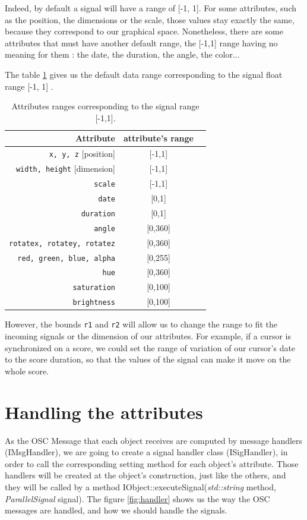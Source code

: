\documentclass[a4paper]{article}
\newcommand{\OSC}[1]		{\texttt{#1}}
\begin{document}
Indeed, by default a signal will have a range of [-1, 1]. For some attributes, such as the position, the dimensions or the scale, those values stay exactly the same, because they correspond to our graphical space. Nonetheless, there are some attributes that must have another default range, the [-1,1] range having no meaning for them : the date, the duration, the angle, the color...

The table \ref{ranges} gives us the default data range corresponding to the signal float range [-1, 1] .

\begin{table}[htdp]
\begin{center}
\begin{tabular}{|r|c|c|}
\hline
Attribute & attribute's range\\
\hline
\OSC{x, y, z} [position] 	& [-1,1]\\
\OSC{width, height} [dimension] 	& [-1,1] \\
\OSC{scale} 		& [-1,1] \\
\OSC{date} 		& [0,1]\\
\OSC{duration} 	& [0,1] \\
\OSC{angle}		& [0,360] \\
\OSC{rotatex, rotatey, rotatez} 		& [0,360] \\
\OSC{red, green, blue, alpha}			& [0,255] \\
\OSC{hue}  		& [0,360]\\
\OSC{saturation}  	& [0,100] \\
\OSC{brightness}  	& [0,100] \\
\hline
\end{tabular}
\end{center}
\caption{Attributes ranges corresponding to the signal range [-1,1].}
\label{ranges}
\end{table}%

However, the bounds \OSC{r1} and \OSC{r2} will allow us to change the range to fit the incoming signals or the dimension of our attributes. For example, if a cursor is synchronized on a score, we could set the range of variation of our cursor's date to the score duration, so that the values of the signal can make it move on the whole score.

\section{Handling the attributes}\label{sec:handler}

As the OSC Message that each object receives are computed by message handlers (IMsgHandler), we are going to create a signal handler class (ISigHandler), in order to call the corresponding setting method for each object's attribute. 
Those handlers will be created at the object's construction, just like the others, and they will be called by a method IObject::executeSignal(\textit{std::string} method, \textit{ParallelSignal} signal). The figure \ref{fig:handler} shows us the way the OSC messages are handled, and how we should handle the signals.
\\
\end{document}
